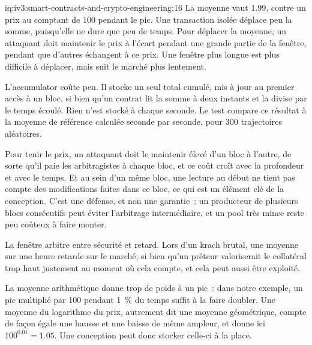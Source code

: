 \begin{solution}{iq:iv3:smart-contracts-and-crypto-engineering:16}
La moyenne vaut 1.99, contre un prix au comptant de 100 pendant le pic. Une transaction isolée déplace peu la somme, puisqu'elle ne dure que peu de temps. Pour déplacer la moyenne, un attaquant doit maintenir le prix à l'écart pendant une grande partie de la fenêtre, pendant que d'autres échangent à ce prix. Une fenêtre plus longue est plus difficile à déplacer, mais suit le marché plus lentement.
\label{lst:iv3:cr:twap}

L'accumulator coûte peu. Il stocke un seul total cumulé, mis à jour au premier accès à un bloc, si bien qu'un contrat lit la somme à deux instants et la divise par le temps écoulé. Rien n'est stocké à chaque seconde. Le test compare ce résultat à la moyenne de référence calculée seconde par seconde, pour 300 trajectoires aléatoires.

Pour tenir le prix, un attaquant doit le maintenir élevé d'un bloc à l'autre, de sorte qu'il paie les arbitragistes à chaque bloc, et ce coût croît avec la profondeur et avec le temps. Et au sein d'un même bloc, une lecture au début ne tient pas compte des modifications faites dans ce bloc, ce qui est un élément clé de la conception. C'est une défense, et non une garantie~: un producteur de plusieurs blocs consécutifs peut éviter l'arbitrage intermédiaire, et un pool très mince reste peu coûteux à faire monter.

La fenêtre arbitre entre sécurité et retard. Lors d'un krach brutal, une moyenne sur une heure retarde sur le marché, si bien qu'un prêteur valoriserait le collatéral trop haut justement au moment où cela compte, et cela peut aussi être exploité.

La moyenne arithmétique donne trop de poids à un pic~: dans notre exemple, un pic multiplié par 100 pendant 1~\% du temps suffit à la faire doubler. Une moyenne du logarithme du prix, autrement dit une moyenne géométrique, compte de façon égale une hausse et une baisse de même ampleur, et donne ici $100^{0.01} = 1.05$. Une conception peut donc stocker celle-ci à la place.

\end{solution}

